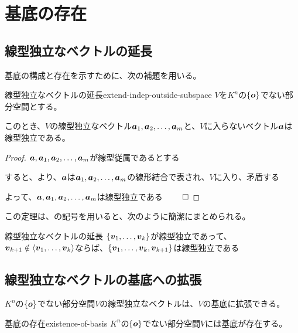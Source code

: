 \documentclass[../../../topic_linear-algebra]{subfiles}
\begin{document}
\sectionline
\section{基底の存在}

\subsection{線型独立なベクトルの延長}

基底の構成と存在を示すために、次の補題を用いる。

\begin{theorem}{線型独立なベクトルの延長}{extend-indep-outside-subspace}
  $V$を$K^n$の$\{\vb*{o} \}$でない部分空間とする。

  このとき、$V$の線型独立なベクトル$\vb*{a}_1, \vb*{a}_2, \dots, \vb*{a}_m$と、$V$に入らないベクトル$\vb*{a}$は線型独立である。
\end{theorem}

\begin{proof}
  $\vb*{a}, \vb*{a}_1, \vb*{a}_2, \dots, \vb*{a}_m$が線型従属であるとする

  すると、より、$\vb*{a}$は$\vb*{a}_1, \vb*{a}_2, \dots, \vb*{a}_m$の線形結合で表され、$V$に入り、矛盾する

  よって、$\vb*{a}, \vb*{a}_1, \vb*{a}_2, \dots, \vb*{a}_m$は線型独立である $\qed$
\end{proof}

\br

この定理は、の記号を用いると、次のように簡潔にまとめられる。

\begin{theorem*}{線型独立なベクトルの延長}
  $\{ \vb*{v}_1, \dots, \vb*{v}_k \}$が線型独立であって、$\vb*{v}_{k+1} \notin \langle \vb*{v}_1, \dots, \vb*{v}_k \rangle$ならば、$\{ \vb*{v}_1, \dots, \vb*{v}_k, \vb*{v}_{k+1} \}$は線型独立である
\end{theorem*}

\subsection{線型独立なベクトルの基底への拡張}

$K^n$の$\{\vb*{o} \}$でない部分空間$V$の線型独立なベクトルは、$V$の基底に拡張できる。

\begin{theorem}{基底の存在}{existence-of-basis}
  $K^n$の$\{\vb*{o} \}$でない部分空間$V$には基底が存在する。
\end{theorem}
\end{document}
